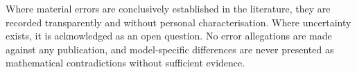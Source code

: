 Where material errors are conclusively established in the literature, they are recorded transparently and without personal characterisation. Where uncertainty exists, it is acknowledged as an open question. No error allegations are made against any publication, and model-specific differences are never presented as mathematical contradictions without sufficient evidence.


